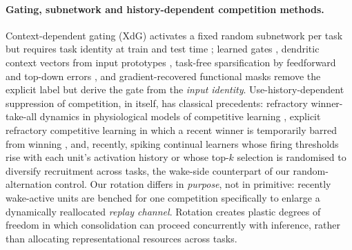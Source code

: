 \documentclass{article}
\begin{document}
\paragraph{Gating, subnetwork and history-dependent competition methods.}
Context-dependent gating (XdG) activates a fixed random subnetwork per task but requires task
identity at train and test time \citep{masse2018}; learned gates \citep{tilley2023}, dendritic
context vectors from input prototypes \citep{iyer2022}, task-free sparsification by feedforward
and top-down errors \citep{lassig2023}, and gradient-recovered functional masks \citep{mckee2026}
remove the explicit label but derive the gate from the \emph{input identity}. Use-history-dependent
suppression of competition, in itself, has classical precedents: refractory winner-take-all
dynamics in physiological models of competitive learning \citep{kaski1994}, explicit refractory
competitive learning in which a recent winner is temporarily barred from winning \citep{maeda1999},
and, recently, spiking continual learners whose firing thresholds rise with each unit's activation
history \citep{shen2024} or whose top-$k$ selection is randomised \citep{shen2026} to diversify
recruitment across tasks, the wake-side counterpart of our random-alternation control. Our
rotation differs in
\emph{purpose}, not in primitive: recently wake-active units are benched for one competition
specifically to enlarge a dynamically reallocated \emph{replay channel}. Rotation creates
plastic degrees of freedom in which consolidation can proceed concurrently with inference,
rather than allocating representational resources across tasks.
\end{document}
